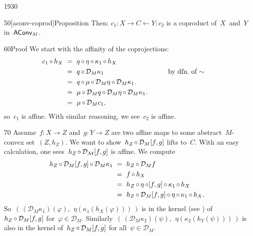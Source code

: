 \begin{parsec}{1930}
\begin{point}{50}[aconv-coprod]{Proposition}
Then: $c_1 \colon X \to C \leftarrow Y \colon c_2$
is a coproduct of~$X$~and~$Y$ in~$\mathsf{AConv}_M$.
\begin{point}{60}{Proof}%
We start with the affinity of the coprojections:
\begin{alignat*}{2}
    c_1 \after h_X & \ = \ 
    q \after \eta \after \kappa_1 \after h_X \\
    &\ =\  q \after \mathcal{D}_M \kappa_1
        &\qquad& \text{by dfn.~of~$\sim$}
    \\
    & \ =\  q \after \mu \after \mathcal{D}_M \eta \after \mathcal{D}_M \kappa_1. \\
    & \ =\  \mu \after \mathcal{D}_Mq \after \mathcal{D}_M \eta \after \mathcal{D}_M \kappa_1. \\
    & \ =\  \mu \after \mathcal{D}_M c_1,
\end{alignat*}
so~$c_1$ is affine. With similar reasoning, we see~$c_2$ is affine.
\begin{point}{70}%
Assume~$f\colon X \to Z$ and~$g\colon Y \to Z$
    are two affine maps to some abstract~$M$-convex set~$(Z,h_Z)$.
We want to show~$h_Z \mathop{\circ} \mathcal{D}_M [f,g]$
    lifts to~$C$.
With an easy calculation,
    one sees~$h_Z \mathop{\circ} \mathcal{D_M} [f,g]$ is affine.
We compute
\begin{align*}
    h_Z \after \mathcal{D}_M [f,g] \after \mathcal{D}_M \kappa_1
     & \ = \ 
    h_Z \after \mathcal{D}_M f \\
     & \ = \ f \after h_X \\
     & \ = \ h_Z \after \eta \after [f,g] \after \kappa_1 \after h_X \\
     & \ = \ h_Z \after \mathcal{D}_M [f,g] \after \eta \after \kappa_1 \after h_X.
\end{align*}
So~$
(\,(\mathcal{D}_M \kappa_1) (\varphi), \,
\ \eta(\kappa_1 ( h_X (\varphi)))\,)$
is in the kernel (see )
of~$h_Z \mathop{\circ} \mathcal{D}_M [f,g]$
for~$\varphi \in \mathcal{D}_M$.
Similarly~$(\,(\mathcal{D}_M \kappa_2) (\psi), \,
\ \eta(\kappa_2 ( h_Y (\psi)))\,)$
is also in the kernel of~$h_Z \mathop{\circ} \mathcal{D}_M [f,g]$
for all~$\psi \in \mathcal{D}_M$.


\end{point}
\end{point}
\end{point}
\end{parsec}
